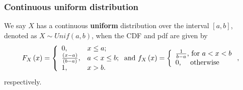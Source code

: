 \documentclass[notes=show,smaller,handout]{beamer}
\begin{document}


\begin{frame}%

\frametitle{Continuous uniform distribution}

\begin{definition}
We say $X$ has a continuous \textbf{uniform} distribution over the
interval $[a,b]$, denoted as $X\sim Unif(a,b)$, when the CDF and pdf are given by
$$
{F_X\left( x\right)}=\left\{
                           \begin{array}{ll}
                             0, & \hbox{$x\leq a$;} \\
                             \frac{(x-a)}{(b-a)}, & \hbox{$a<x\leq b$;} \\
                             1, & \hbox{$x>b$.}
                           \end{array}
                         \right.\mbox{\color{black}and}~{f_{X}\left( x\right)} =\left\{
\begin{array}{l}
\frac{1}{b-a}\text{, for }a<x<b \\
0\text{, \quad otherwise}%
\end{array}%
\right. ,
$$
respectively.
\end{definition}
\end{frame}%
\end{document}
